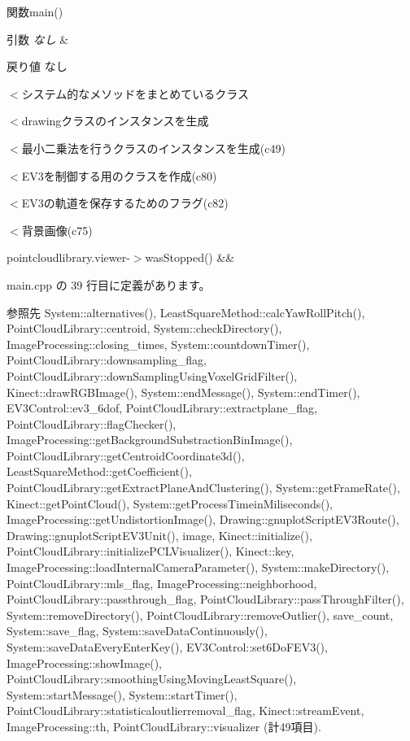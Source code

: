関数main() 


\begin{DoxyParams}{引数}
{\em なし} & \\
\hline
\end{DoxyParams}
\begin{DoxyReturn}{戻り値}
なし 
\end{DoxyReturn}
$<$システム的なメソッドをまとめているクラス

$<$drawingクラスのインスタンスを生成

$<$最小二乗法を行うクラスのインスタンスを生成(c49)

$<$E\-V3を制御する用のクラスを作成(c80)

$<$E\-V3の軌道を保存するためのフラグ(c82)

$<$背景画像(c75)

pointcloudlibrary.\-viewer-\/$>$was\-Stopped() \&\& 

 main.\-cpp の 39 行目に定義があります。



参照先 System\-::alternatives(), Least\-Square\-Method\-::calc\-Yaw\-Roll\-Pitch(), Point\-Cloud\-Library\-::centroid, System\-::check\-Directory(), Image\-Processing\-::closing\-\_\-times, System\-::countdown\-Timer(), Point\-Cloud\-Library\-::downsampling\-\_\-flag, Point\-Cloud\-Library\-::down\-Sampling\-Using\-Voxel\-Grid\-Filter(), Kinect\-::draw\-R\-G\-B\-Image(), System\-::end\-Message(), System\-::end\-Timer(), E\-V3\-Control\-::ev3\-\_\-6dof, Point\-Cloud\-Library\-::extractplane\-\_\-flag, Point\-Cloud\-Library\-::flag\-Checker(), Image\-Processing\-::get\-Background\-Substraction\-Bin\-Image(), Point\-Cloud\-Library\-::get\-Centroid\-Coordinate3d(), Least\-Square\-Method\-::get\-Coefficient(), Point\-Cloud\-Library\-::get\-Extract\-Plane\-And\-Clustering(), System\-::get\-Frame\-Rate(), Kinect\-::get\-Point\-Cloud(), System\-::get\-Process\-Timein\-Miliseconds(), Image\-Processing\-::get\-Undistortion\-Image(), Drawing\-::gnuplot\-Script\-E\-V3\-Route(), Drawing\-::gnuplot\-Script\-E\-V3\-Unit(), image, Kinect\-::initialize(), Point\-Cloud\-Library\-::initialize\-P\-C\-L\-Visualizer(), Kinect\-::key, Image\-Processing\-::load\-Internal\-Camera\-Parameter(), System\-::make\-Directory(), Point\-Cloud\-Library\-::mls\-\_\-flag, Image\-Processing\-::neighborhood, Point\-Cloud\-Library\-::passthrough\-\_\-flag, Point\-Cloud\-Library\-::pass\-Through\-Filter(), System\-::remove\-Directory(), Point\-Cloud\-Library\-::remove\-Outlier(), save\-\_\-count, System\-::save\-\_\-flag, System\-::save\-Data\-Continuously(), System\-::save\-Data\-Every\-Enter\-Key(), E\-V3\-Control\-::set6\-Do\-F\-E\-V3(), Image\-Processing\-::show\-Image(), Point\-Cloud\-Library\-::smoothing\-Using\-Moving\-Least\-Square(), System\-::start\-Message(), System\-::start\-Timer(), Point\-Cloud\-Library\-::statisticaloutlierremoval\-\_\-flag, Kinect\-::stream\-Event, Image\-Processing\-::th, Point\-Cloud\-Library\-::visualizer (計49項目).


